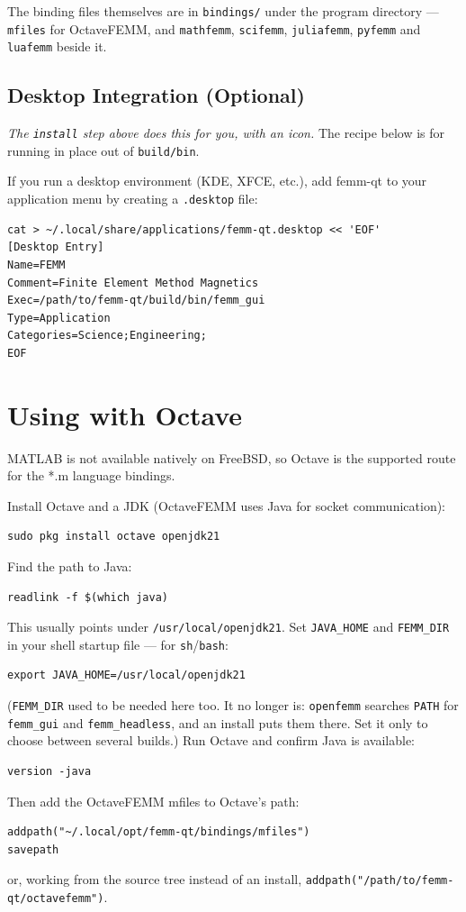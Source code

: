 \documentclass[11pt]{article}
\begin{document}
The binding files themselves are in \texttt{bindings/} under the program
directory --- \texttt{mfiles} for OctaveFEMM, and \texttt{mathfemm},
\texttt{scifemm}, \texttt{juliafemm}, \texttt{pyfemm} and
\texttt{luafemm} beside it.

\subsection{Desktop Integration (Optional)}

\emph{The \texttt{install} step above does this for you, with an icon.}
The recipe below is for running in place out of \texttt{build/bin}.

If you run a desktop environment (KDE, XFCE, etc.), add femm-qt to your
application menu by creating a \texttt{.desktop} file:
\begin{lstlisting}
cat > ~/.local/share/applications/femm-qt.desktop << 'EOF'
[Desktop Entry]
Name=FEMM
Comment=Finite Element Method Magnetics
Exec=/path/to/femm-qt/build/bin/femm_gui
Type=Application
Categories=Science;Engineering;
EOF
\end{lstlisting}

\section{Using with Octave}

MATLAB is not available natively on FreeBSD, so Octave is the supported route
for the *.m language bindings.

Install Octave and a JDK (OctaveFEMM uses Java for socket communication):
\begin{lstlisting}
sudo pkg install octave openjdk21
\end{lstlisting}
Find the path to Java:
\begin{lstlisting}
readlink -f $(which java)
\end{lstlisting}
This usually points under \texttt{/usr/local/openjdk21}.  Set
\texttt{JAVA\_HOME} and \texttt{FEMM\_DIR} in your shell startup file ---
for \texttt{sh}/\texttt{bash}:
\begin{lstlisting}
export JAVA_HOME=/usr/local/openjdk21
\end{lstlisting}
(\texttt{FEMM\_DIR} used to be needed here too.  It no longer is:
\texttt{openfemm} searches \texttt{PATH} for \texttt{femm\_gui} and
\texttt{femm\_headless}, and an install puts them there.  Set it only to
choose between several builds.)
Run Octave and confirm Java is available:
\begin{lstlisting}
version -java
\end{lstlisting}
Then add the OctaveFEMM mfiles to Octave's path:
\begin{lstlisting}
addpath("~/.local/opt/femm-qt/bindings/mfiles")
savepath
\end{lstlisting}
or, working from the source tree instead of an install,
\verb+addpath("/path/to/femm-qt/octavefemm")+.
\end{document}
